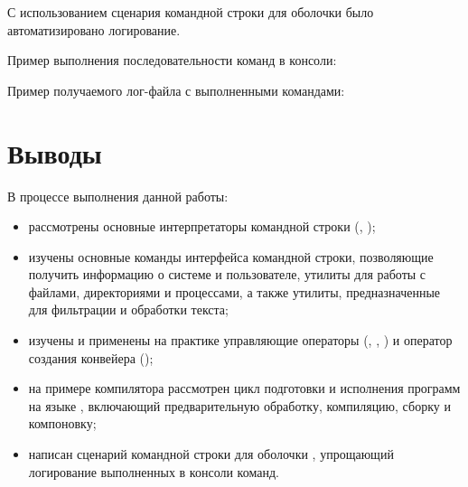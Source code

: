 С использованием сценария командной строки для оболочки  было автоматизировано логирование. 


Пример выполнения последовательности команд в консоли:


Пример получаемого лог-файла с выполненными командами:



\section{Выводы}

В процессе выполнения данной работы:
\begin{itemize}
	\item рассмотрены основные интерпретаторы командной строки (, );
	\item изучены основные команды интерфейса командной строки, позволяющие получить информацию о системе и пользователе, утилиты для работы с файлами, директориями и процессами, а также утилиты, предназначенные для фильтрации и обработки текста;
	\item изучены и применены на практике управляющие операторы (\code{\&}, \code{\&\&}, \code{||}) и оператор создания конвейера (\code{|});
	\item на примере компилятора  рассмотрен цикл подготовки и исполнения программ на языке , включающий предварительную обработку, компиляцию, сборку и компоновку;
	\item написан сценарий командной строки для оболочки , упрощающий логирование выполненных в консоли команд.
\end{itemize}


